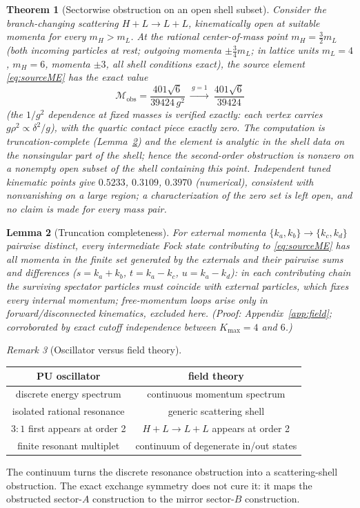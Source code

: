 \documentclass[11pt]{article}
\newtheorem{theorem}{Theorem}[section]
\newtheorem{lemma}[theorem]{Lemma}
\theoremstyle{definition}
\theoremstyle{remark}
\newtheorem{remark}[theorem]{Remark}
\begin{document}
\begin{theorem}[Sectorwise obstruction on an open shell subset]
\label{thm:sector}
Consider the branch-changing scattering $H+L\to L+L$, kinematically
open at suitable momenta for every $m_H>m_L$.  At the rational
center-of-mass point $m_H=\tfrac32m_L$ (both incoming particles at
rest; outgoing momenta $\pm\tfrac34m_L$; in lattice units $m_L=4$,
$m_H=6$, momenta $\pm3$, all shell conditions exact), the source
element \eqref{eq:sourceME} has the exact value
\begin{equation}
\boxed{\ \mathcal M_{\mathrm{obs}}
=\frac{401\sqrt6}{39424\,g^2}
\ \xrightarrow{\ g=1\ }\ \frac{401\sqrt6}{39424}\ }
\end{equation}
(the $1/g^2$ dependence at fixed masses is verified exactly: each
vertex carries $g\rho^2\propto\delta^2/g$), with the quartic contact
piece exactly zero.  The computation is
truncation-complete (Lemma~\ref{lem:trunc}) and the element is analytic
in the shell data on the nonsingular part of the shell; hence
\emph{the second-order obstruction is nonzero on a nonempty open subset
of the shell containing this point}.  Independent tuned kinematic
points give $0.5233$, $0.3109$, $0.3970$ (numerical), consistent with
nonvanishing on a large region; a characterization of the zero set is
left open, and no claim is made for every mass pair.
\end{theorem}

\begin{lemma}[Truncation completeness]\label{lem:trunc}
For external momenta $\{k_a,k_b\}\to\{k_c,k_d\}$ pairwise distinct,
every intermediate Fock state contributing to \eqref{eq:sourceME} has
all momenta in the finite set generated by the externals and their
pairwise sums and differences ($s=k_a+k_b$, $t=k_a-k_c$, $u=k_a-k_d$):
in each contributing chain the surviving spectator particles must
coincide with external particles, which fixes every internal momentum;
free-momentum loops arise only in forward/disconnected kinematics,
excluded here.  (Proof: Appendix~\ref{app:field}; corroborated by exact
cutoff independence between $K_{\max}=4$ and $6$.)
\end{lemma}

\begin{remark}[Oscillator versus field theory]
\begin{center}
\begin{tabular}{c|c}
PU oscillator & field theory\\
\hline
discrete energy spectrum & continuous momentum spectrum\\
isolated rational resonance & generic scattering shell\\
$3{:}1$ first appears at order 2 & $H+L\to L+L$ appears at order 2\\
finite resonant multiplet & continuum of degenerate in/out states
\end{tabular}
\end{center}
The continuum turns the discrete resonance obstruction into a
scattering-shell obstruction.  The exact exchange symmetry does not
cure it: it maps the obstructed sector-$A$ construction to the mirror
sector-$B$ construction.
\end{remark}
\end{document}
